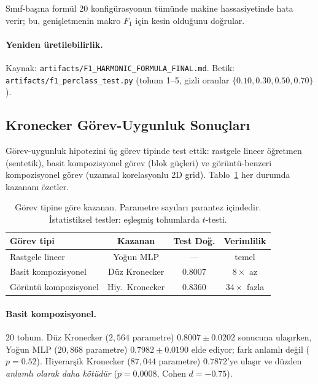 \documentclass[11pt,a4paper]{article}
\begin{document}
Sınıf-başına formül 20 konfigürasyonun tümünde makine hassasiyetinde
hata verir; bu, genişletmenin makro $F_1$ için kesin olduğunu doğrular.

\paragraph{Yeniden üretilebilirlik.}
Kaynak: \texttt{artifacts/F1\_HARMONIC\_FORMULA\_FINAL.md}.
Betik: \texttt{artifacts/f1\_perclass\_test.py} (tohum 1--5, gizli oranlar
$\{0.10, 0.30, 0.50, 0.70\}$).


\subsection{Kronecker Görev-Uygunluk Sonuçları}
\label{sec:exp-kronecker}

Görev-uygunluk hipotezini üç görev tipinde test ettik: rastgele lineer
öğretmen (sentetik), basit kompozisyonel görev (blok güçleri) ve
görüntü-benzeri kompozisyonel görev (uzamsal korelasyonlu 2D grid).
Tablo~\ref{tab:kronecker} her durumda kazananı özetler.

\begin{table}[h]
\centering
\caption{Görev tipine göre kazanan. Parametre sayıları parantez
içindedir. İstatistiksel testler: eşleşmiş tohumlarda $t$-testi.}
\label{tab:kronecker}
\small
\begin{tabular}{lccc}
\toprule
Görev tipi & Kazanan & Test Doğ. & Verimlilik \\
\midrule
Rastgele lineer          & Yoğun MLP          & ---      & temel \\
Basit kompozisyonel      & Düz Kronecker      & $0.8007$ & $8\times$ az \\
Görüntü kompozisyonel    & Hiy.\ Kronecker    & $0.8360$ & $34\times$ fazla \\
\bottomrule
\end{tabular}
\end{table}

\paragraph{Basit kompozisyonel.}
20 tohum. Düz Kronecker ($2{,}564$ parametre) $0.8007 \pm 0.0202$
sonucuna ulaşırken, Yoğun MLP ($20{,}868$ parametre) $0.7982 \pm 0.0190$
elde ediyor; fark anlamlı değil ($p = 0.52$). Hiyerarşik Kronecker
($87{,}044$ parametre) $0.7872$'ye ulaşır ve düzden
\emph{anlamlı olarak daha kötüdür} ($p = 0.0008$, Cohen $d = -0.75$).
\end{document}

